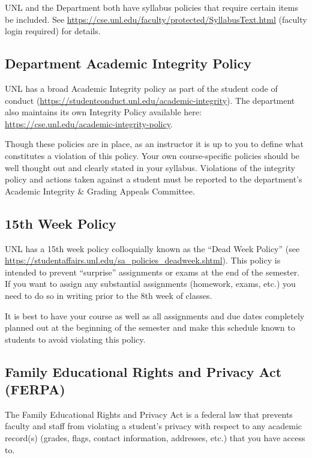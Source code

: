 \documentclass[12pt]{scrartcl}
\begin{document}
UNL and the Department both have syllabus policies that require
certain items be included.  See 
\url{https://cse.unl.edu/faculty/protected/SyllabusText.html} (faculty login required) for details.

\subsection{Department Academic Integrity Policy}

UNL has a broad Academic Integrity policy as part of the
student code of conduct (\url{https://studentconduct.unl.edu/academic-integrity}).  The department also maintains its own Integrity
Policy available here: \url{https://cse.unl.edu/academic-integrity-policy}.

Though these policies are in place, as an instructor it is up
to you to define what constitutes a violation of this policy.
Your own course-specific policies should be well thought out and
clearly stated in your syllabus.  Violations of the integrity
policy and actions taken against a student must be reported to
the department's Academic Integrity \& Grading Appeals Committee.

\subsection{15th Week Policy}

UNL has a 15th week policy colloquially known as the ``Dead Week
Policy'' (see \url{https://studentaffairs.unl.edu/sa_policies_deadweek.shtml}).  This policy is intended to prevent
``surprise'' assignments or exams at the end of the semester.
If you want to assign any substantial assignments (homework, 
exams, etc.) you need to do so in writing prior to the 8th week
of classes.  

It is best to have your course as well as all assignments and
due dates completely planned out at the beginning of the semester
and make this schedule known to students to avoid violating this
policy.  

\subsection{Family Educational Rights and Privacy Act (FERPA)}

The Family Educational Rights and Privacy Act is a federal law
that prevents faculty and staff from violating a student's privacy
with respect to any academic record(s) (grades, flags, contact
information, addresses, etc.) that you have access to.  
\end{document}
